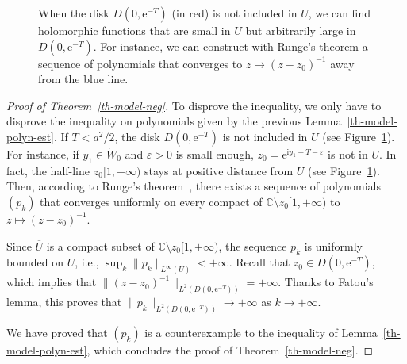 \documentclass[10pt]{amsart}
\theoremstyle{definition}\newtheorem{defi}[theo]{Definition}\newtheorem{rema}[theo]{Remark}\newtheorem{exam}[theo]{Example}\newtheorem{exem}[theo]{Example}\newtheorem{nota}[theo]{Notation}
\newcommand{\1}{\mathds 1}
\newcommand{\C}{\mathbb{C}}
\newcommand{\rgW}{\mathring{W}}
\newcommand{\eu}{\mathrm e}
\newcommand{\iu}{\mathrm i}
\newcommand{\e}{\varepsilon}
\begin{document}
\begin{figure}
\centering
{}
\caption{When the disk $D(0,\eu^{-T})$ (in red) is not included in $U$, we can find holomorphic functions that are small in $U$ but arbitrarily large in $D(0,\eu^{-T})$. For instance, we can construct with Runge's theorem a sequence of polynomials that converges to $z\mapsto(z-z_0)^{-1}$ away from the blue line.}\label{fig:runge-R}
\end{figure}

\begin{proof}[Proof of Theorem~\ref{th-model-neg}]
To disprove the inequality, we only have to disprove the inequality on polynomials given by the previous Lemma~\ref{th-model-polyn-est}. If $T< a^2/2$, the disk $D(0,\eu^{-T})$ is not included in $U$ (see Figure~\ref{fig:runge-R}). For instance, if $y_1\in \rgW_0$ and $\e>0$ is small enough, $z_0 = \eu^{\iu y_1 -T-\e}$ is not in $U$. In fact, the half-line $z_0[1,+\infty)$ stays at positive distance from $U$ (see Figure~\ref{fig:runge-R}). Then, according to Runge's theorem~\cite[Theorem~13.9]{Rudin86}, there exists a sequence of polynomials $(p_k)$ that converges uniformly on every compact of $\C \setminus z_0[1,+\infty)$ to $z\mapsto (z-z_0)^{-1}$.

Since $\overline U$ is a compact subset of $\C \setminus z_0[1,+\infty)$, the sequence $p_k$ is uniformly bounded on $U$, i.e., $\sup_k \|p_k\|_{L^\infty(U)} < +\infty$. Recall that $z_0 \in D(0,\eu^{-T})$, which implies that ${\|(z-z_0)^{-1}\|_{L^2(D(0,\eu^{-T}))}} = +\infty$. Thanks to Fatou's lemma, this proves that $\|p_k\|_{L^2(D(0,\eu^{-T}))} \to +\infty$ as $k\to + \infty$.

We have proved that $(p_k)$ is a counterexample to the inequality of Lemma~\ref{th-model-polyn-est}, which concludes the proof of Theorem~\ref{th-model-neg}.
\end{proof}
\end{document}
